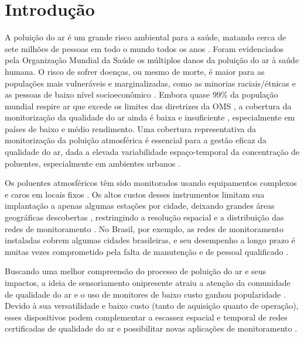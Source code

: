\chapter{Introdução}

A poluição do ar é um grande risco ambiental para a saúde, matando cerca de sete milhões de pessoas em todo o mundo todos os anos \cite{who2021}. Foram evidenciados pela Organização Mundial da Saúde \cite{who2021} os múltiplos danos da poluição do ar à saúde humana. O risco de sofrer doenças, ou mesmo de morte, é maior para as populações mais vulneráveis e marginalizadas, como as minorias raciais/étnicas e as pessoas de baixo nível socioeconômico \cite{Jbaily2022AirGroups}. Embora quase 99\% da população mundial respire ar que excede os limites das diretrizes da OMS \cite{who2021}, a cobertura da monitorização da qualidade do ar ainda é baixa e insuficiente \cite{Munir2019AnalysingSheffield}, especialmente em países de baixo e médio rendimento. Uma cobertura representativa da monitorização da poluição atmosférica é essencial para a gestão eficaz da qualidade do ar, dada a elevada variabilidade espaço-temporal da concentração de poluentes, especialmente em ambientes urbanos \cite{Kumar2015,Mead2013TheNetworks}.

Os poluentes atmosféricos têm sido monitorados usando equipamentos complexos e caros em locais fixos \cite{Kang2022PerformanceReview}. Os altos custos desses instrumentos limitam sua implantação a apenas algumas estações por cidade, deixando grandes áreas geográficas descobertas \cite{Munir2019AnalysingSheffield}, restringindo a resolução espacial e a distribuição das redes de monitoramento \cite{Jiao2016CommunityStates,Kumar2015}. No Brasil, por exemplo, as redes de monitoramento instaladas cobrem algumas cidades brasileiras, e seu desempenho a longo prazo é muitas vezes comprometido pela falta de manutenção e de pessoal qualificado \cite{Vormittag2021AnaliseBrasil}.

Buscando uma melhor compreensão do processo de poluição do ar e seus impactos, a ideia de sensoriamento onipresente atraiu a atenção da comunidade de qualidade do ar e o uso de monitores de baixo custo ganhou popularidade \cite{Motlagh2020TowardMonitoring,Kumar2015}. Devido à sua versatilidade e baixo custo (tanto de aquisição quanto de operação), esses dispositivos podem complementar a escassez espacial e temporal de redes certificadas de qualidade do ar e possibilitar novas aplicações de monitoramento \cite*{Lewis2016EvaluatingResearch}.

